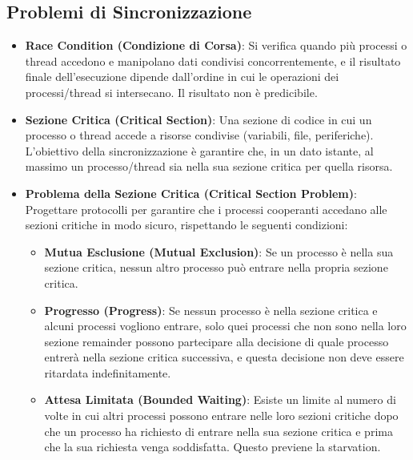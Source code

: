 \subsection{Problemi di Sincronizzazione}
\begin{itemize}
    \item \textbf{Race Condition (Condizione di Corsa)}: Si verifica quando più processi o thread accedono e manipolano dati condivisi concorrentemente, e il risultato finale dell'esecuzione dipende dall'ordine in cui le operazioni dei processi/thread si intersecano. Il risultato non è predicibile.
    \item \textbf{Sezione Critica (Critical Section)}: Una sezione di codice in cui un processo o thread accede a risorse condivise (variabili, file, periferiche). L'obiettivo della sincronizzazione è garantire che, in un dato istante, al massimo un processo/thread sia nella sua sezione critica per quella risorsa.
    \item \textbf{Problema della Sezione Critica (Critical Section Problem)}: Progettare protocolli per garantire che i processi cooperanti accedano alle sezioni critiche in modo sicuro, rispettando le seguenti condizioni:
    \begin{itemize}
        \item \textbf{Mutua Esclusione (Mutual Exclusion)}: Se un processo è nella sua sezione critica, nessun altro processo può entrare nella propria sezione critica.
        \item \textbf{Progresso (Progress)}: Se nessun processo è nella sezione critica e alcuni processi vogliono entrare, solo quei processi che non sono nella loro sezione remainder possono partecipare alla decisione di quale processo entrerà nella sezione critica successiva, e questa decisione non deve essere ritardata indefinitamente.
        \item \textbf{Attesa Limitata (Bounded Waiting)}: Esiste un limite al numero di volte in cui altri processi possono entrare nelle loro sezioni critiche dopo che un processo ha richiesto di entrare nella sua sezione critica e prima che la sua richiesta venga soddisfatta. Questo previene la starvation.
    \end{itemize}
\end{itemize}

